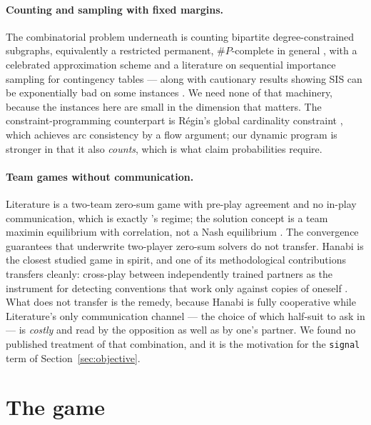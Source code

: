 \documentclass[11pt,a4paper]{article}
\begin{document}
\paragraph{Counting and sampling with fixed margins.} The combinatorial problem
underneath is counting bipartite degree-constrained subgraphs, equivalently a
restricted permanent, $\#P$-complete in general \citep{valiant1979complexity},
with a celebrated approximation scheme \citep{jerrum2004polynomial} and a
literature on sequential importance sampling for contingency tables
\citep{chen2005sequential} --- along with cautionary results showing SIS can be
exponentially bad on some instances \citep{bezakova2012negative}. We need none
of that machinery, because the instances here are small in the dimension that
matters. The constraint-programming counterpart is R\'egin's global cardinality
constraint \citep{regin1996generalized}, which achieves arc consistency by a
flow argument; our dynamic program is stronger in that it also \emph{counts},
which is what claim probabilities require.

\paragraph{Team games without communication.} Literature is a two-team zero-sum
game with pre-play agreement and no in-play communication, which is exactly
\citeauthor{celli2018computational}'s regime; the solution concept is a team
maximin equilibrium with correlation, not a Nash equilibrium
\citep{vonstengel1997team,celli2018computational}. The convergence guarantees
that underwrite two-player zero-sum solvers do not transfer. Hanabi
\citep{bard2020hanabi} is the closest studied game in spirit, and one of its
methodological contributions transfers cleanly: cross-play between
independently trained partners as the instrument for detecting conventions that
work only against copies of oneself \citep{hu2020otherplay}. What does not
transfer is the remedy, because Hanabi is fully cooperative while Literature's
only communication channel --- the choice of which half-suit to ask in --- is
\emph{costly} and read by the opposition as well as by one's partner. We found
no published treatment of that combination, and it is the motivation for the
\texttt{signal} term of Section~\ref{sec:objective}.

\section{The game}
\label{sec:game}
\end{document}
